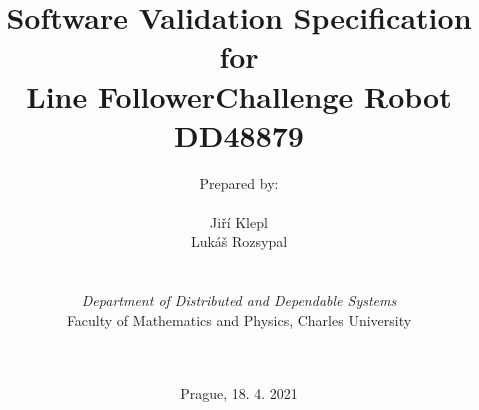 \def\Company{Faculty of Mathematics and Physics, Charles University}
\def\Institute{\textit{Department of Distributed and Dependable Systems}}
\def\Course{\textit{}}
\def\Module{\textit{ }}
\def\Docent{\textit{}}
\def\Assistant{\textit{}}

\def\BoldTitle{Software Validation Specification}

\def\Subtitle{for \\ Line FollowerChallenge Robot DD48879 \\}
\def\Authors{Prepared by:\\\\ Jiří Klepl \\ Lukáš Rozsypal } 
\def\Shortname{J.Klepl; L.Rozsypal}


\title{\textbf{\BoldTitle}\\\Subtitle}
\author{\Authors \\ \\ \\ \Institute\\ \Company\\ \Module\\ \Docent\\ \Assistant}
\date{Prague, 18. 4. 2021}


